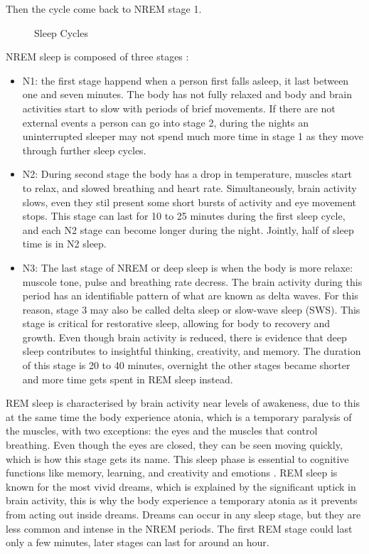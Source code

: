 Then the cycle come back to NREM stage 1.


\begin{figure}[H]
    \centering
        \caption{Sleep Cycles}
    \label{diag:slepcy}
\end{figure}


NREM sleep is composed of three stages \cite{StagesFoundation}:
\begin{itemize}
    \item N1: the first stage happend when a person first falls asleep, it last between one and seven minutes. The body has not fully relaxed and body and brain activities start to slow with periods of brief movements. If there are not external events a person can go into stage 2, during the nights an uninterrupted sleeper may not spend much more time in stage 1 as they move through further sleep cycles.
    \item N2: During second stage the body has a drop in temperature,  muscles start to relax, and slowed breathing and heart rate. Simultaneously, brain activity slows, even they stil present some short bursts of activity and eye movement stops. This stage can last for 10 to 25 minutes during the first sleep cycle, and each N2 stage can become longer during the night. Jointly, half of sleep time is in N2 sleep.
    \item N3: The last stage of NREM or deep sleep is when the body is more relaxe: muscole tone, pulse and breathing rate decress.
    The brain activity during this period has an identifiable pattern of what are known as delta waves. For this reason, stage 3 may also be called delta sleep or slow-wave sleep (SWS). This stage is critical for restorative sleep, allowing for body to recovery and growth. Even though brain activity is reduced, there is evidence that deep sleep contributes to insightful thinking, creativity, and memory\cite{Yordanova2010DifferentialRegularity}. The duration of this stage is 20 to 40 minutes, overnight the other stages became shorter and more time gets spent in REM sleep instead.
\end{itemize}

REM sleep is characterised by brain activity near levels of awakeness, due to this at the same time the body experience atonia, which is a temporary paralysis of the muscles, with two exceptions: the eyes and the muscles that control breathing. Even though the eyes are closed, they can be seen moving quickly, which is how this stage gets its name.
This sleep phase is essential to cognitive functions like memory, learning, and creativity and emotions \cite{Baran2012ProcessingSleep}.
REM sleep is known for the most vivid dreams, which is explained by the significant uptick in brain activity, this is why the body experience a temporary atonia as it prevents from acting out inside dreams. Dreams can occur in any sleep stage, but they are less common and intense in the NREM periods. The first REM stage could last only a few minutes, later stages can last for around an hour.

